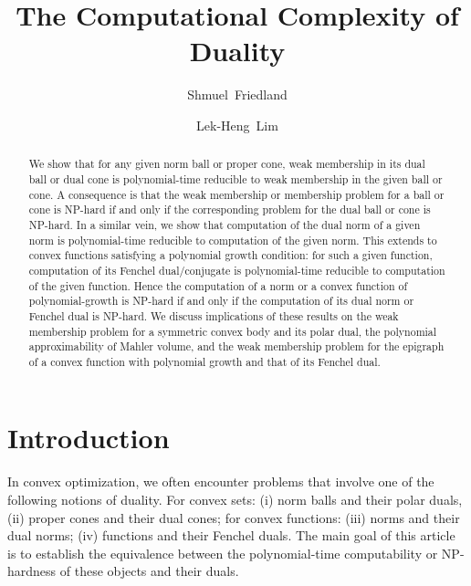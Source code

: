 \documentclass[11pt,reqno]{amsart}
\theoremstyle{definition}
\theoremstyle{remark}
\begin{document}
\title{The Computational Complexity of Duality}
\author[S.~Friedland]{Shmuel~Friedland}
\address{Department of Mathematics, Statistics and Computer Science,  University of Illinois, Chicago}
\author[L.-H.~Lim]{Lek-Heng~Lim}
\address{Computational and Applied Mathematics Initiative, Department of Statistics,
University of Chicago}
\begin{abstract}
We show that for any given norm ball or proper cone, weak membership in its dual ball or dual cone  is polynomial-time reducible to  weak membership in the given ball or cone. A consequence is that the weak membership or membership problem for a ball or cone is NP-hard if and only if the corresponding problem for the dual ball or cone is NP-hard. In a similar vein, we show that computation of the dual norm of a given norm is polynomial-time reducible to computation of the given norm. This extends to convex functions satisfying a polynomial growth condition: for such a given function, computation of its Fenchel dual/conjugate is polynomial-time reducible to computation of the given function. Hence the computation of a norm or a convex function of polynomial-growth is NP-hard if and only if the computation of its dual norm or Fenchel dual is NP-hard. We discuss implications of these results on the weak membership problem for a symmetric convex body and its polar dual, the polynomial approximability of Mahler volume, and the weak membership problem for the epigraph of a convex function with polynomial growth and that of its Fenchel dual.
\end{abstract}



\maketitle

\section{Introduction}

In convex optimization, we often encounter problems that involve one of the following notions of duality. For convex sets: (i) norm balls and their polar duals, (ii) proper cones and their dual cones; for convex functions:
(iii) norms and their dual norms; (iv) functions and their Fenchel duals. The main goal of this article is to establish the equivalence between the polynomial-time computability or NP-hardness of these objects and their duals.
\end{document}
